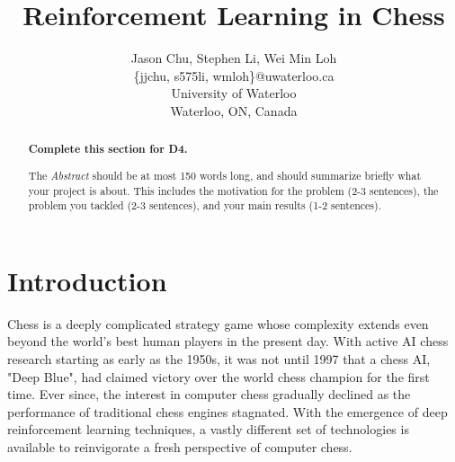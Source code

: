 \documentclass[letterpaper]{article} %
\begin{document}
%
\title{Reinforcement Learning in Chess}
\author{Jason Chu, Stephen Li, Wei Min Loh\\
\{jjchu, s575li, wmloh\}@uwaterloo.ca\\
University of Waterloo\\
Waterloo, ON, Canada\\
}
\maketitle


\begin{abstract}
{\bf Complete this section for D4.}

The {\it Abstract} should be at most 150 words long, and should summarize briefly what your project is about.  This includes the motivation for the problem (2-3 sentences), the problem you tackled (2-3 sentences), and your main results (1-2 sentences).   
\end{abstract}


\section{Introduction} 

Chess is a deeply complicated strategy game whose complexity extends even beyond the world's best human players in the present day. With active AI chess research starting as early as the 1950s, it was not until 1997 that a chess AI, "Deep Blue", had claimed victory over the world chess champion for the first time. Ever since, the interest in computer chess gradually declined as the performance of traditional chess engines stagnated. With the emergence of deep reinforcement learning techniques, a vastly different set of technologies is available to reinvigorate a fresh perspective of computer chess.
\end{document}
